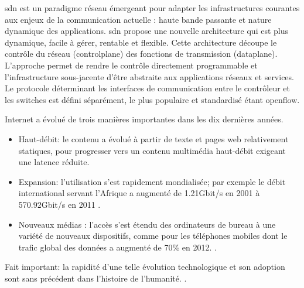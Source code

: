 \gls{sdn} est un \gls{paradigme} réseau émergeant pour adapter les infrastructures courantes aux enjeux de la communication actuelle : haute bande passante et nature dynamique des applications. \gls{sdn} propose une nouvelle architecture qui est plus dynamique, facile à gérer, rentable et flexible. Cette architecture découpe le contrôle du réseau (\gls{controlplane}) des fonctions de transmission (\gls{dataplane}). L'approche permet de rendre le contrôle directement programmable et l'infrastructure sous-jacente d'être abstraite aux applications réseaux et services. Le protocole déterminant les interfaces de communication entre le contrôleur et les switches est défini séparément, le plus populaire et standardisé étant \gls{openflow}. \cite{OpenFlowStanford} \cite{ODCAintro} \cite{SDNNewNormONFExecutiveSummary}

Internet a évolué de trois manières importantes dans les dix dernières années. 
\begin{itemize}
\item Haut-débit: le contenu a évolué à partir de texte et pages web relativement statiques, pour progresser vers un contenu multimédia haut-débit exigeant une latence réduite. 
\item Expansion: l'utilisation s'est rapidement mondialisée; par exemple le débit international servant l'Afrique a augmenté de 1.21Gbit/s en 2001 à 570.92Gbit/s en 2011 \cite{InternetGlobalGrowthImpactDevelopingCountries}.
\item  Nouveaux médias : l'accès s'est étendu des ordinateurs de bureau à une variété de nouveaux dispositifs, comme pour les téléphones mobiles dont le trafic global des données a augmenté de 70\% en 2012. \cite{CiscoVNI2013}. 
\end{itemize}
Fait important: la rapidité d'une telle évolution technologique et son adoption sont sans précédent dans l'histoire de l'humanité. \cite{InternetGlobalGrowthImpactDevelopingCountries}.


